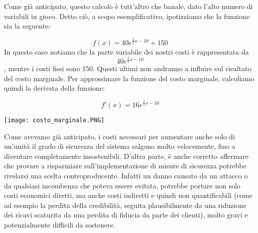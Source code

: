 \documentclass[12pt]{article}
\begin{document}
Come già anticipato, questo calcolo è tutt’altro che banale, dato l’alto numero di variabili in gioco. Detto ciò, a scopo esemplificativo, ipotizziamo che la funzione sia la seguente:

\[f(x) = 40e^{\frac{2}{5}x-10}+150\]
In questo caso notiamo che la parte variabile dei nostri costi è rappresentata da \[40e^{\frac{2}{5}x-10}\], mentre i costi fissi sono 150. Questi ultimi non andranno a influire sul risultato del costo marginale.
Per approssimare la funzione del costo marginale, calcoliamo quindi la derivata della funzione:

\[f'(x) = 16e^{\frac{2}{5}x-10}\]

\begin{center}
    \texttt{[image: costo\_marginale.PNG]}
\end{center}

Come avevamo già anticipato, i costi necessari per aumentare anche solo di un’unità il grado di sicurezza del sistema salgono molto velocemente, fino a diventare completamente insostenibili.
D’altra parte, è anche corretto affermare che provare a risparmiare sull’implementazione di misure di sicurezza potrebbe rivelarsi una scelta controproducente.
Infatti un danno causato da un attacco o da qualsiasi incombenza che poteva essere evitata, potrebbe portare non solo costi economici diretti, ma anche costi indiretti e quindi non quantificabili (come ad esempio la perdita della credibilità, seguita plausibilmente da una riduzione dei ricavi scaturita da una perdita di fiducia da parte dei clienti), molto gravi e potenzialmente difficili da sostenere.

\bigskip
\end{document}
